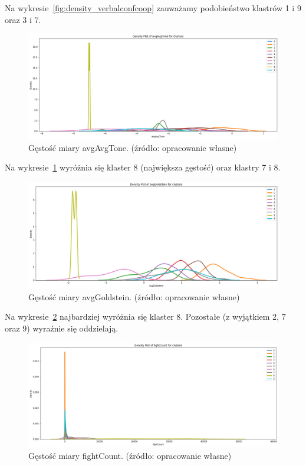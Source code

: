 \documentclass[11pt]{report}
\begin{document}
    Na wykresie~\ref{fig:density_verbalconfcoop} zauważamy podobieństwo klastrów 1 i 9 oraz 3 i 7.

    \begin{figure}[!htp]
        \centering
        \includegraphics[width=\linewidth]{fig/CLUST/density_avgAvgTone.png}
        \caption{Gęstość miary avgAvgTone. (źródło: opracowanie własne)}
        \label{fig:density_avgavgtone}
    \end{figure}

    Na wykresie~\ref{fig:density_avgavgtone} wyróżnia się klaster 8 (największa gęstość) oraz klastry 7 i 8.


    \begin{figure}[!htp]
        \centering
        \includegraphics[width=\linewidth]{fig/CLUST/density_avgGoldstein.png}
        \caption{Gęstość miary avgGoldstein. (źródło: opracowanie własne)}
        \label{fig:density_avggoldstein}
    \end{figure}

    Na wykresie~\ref{fig:density_avggoldstein} najbardziej wyróżnia się klaster 8.
    Pozostałe (z wyjątkiem 2, 7 oraz 9) wyraźnie się oddzielają.

    \begin{figure}[!htp]
        \centering
        \includegraphics[width=\linewidth]{fig/CLUST/density_fightCount.png}
        \caption{Gęstość miary fightCount. (źródło: opracowanie własne)}
        \label{fig:density_fightcount}
    \end{figure}
\end{document}
